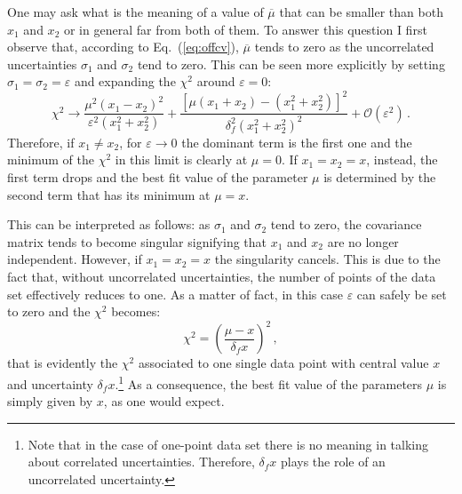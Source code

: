 \documentclass[10pt,a4paper]{article}
\begin{document}
One may ask what is the meaning of a value of $\overline{\mu}$ that
can be smaller than both $x_1$ and $x_2$ or in general far from both
of them. To answer this question I first observe that, according to
Eq.~(\ref{eq:offcv}), $\overline{\mu}$ tends to zero as the
uncorrelated uncertainties $\sigma_1$ and $\sigma_2$ tend to zero.
This can be seen more explicitly by setting
$\sigma_1=\sigma_2=\varepsilon$ and expanding the $\chi^2$ around
$\varepsilon = 0$:
\begin{equation}\label{eq:chi2exp}
\chi^2\rightarrow \frac{\mu^2(x_1-x_2)^2}{\varepsilon^2(x_1^2+x_2^2)}+\frac{\left[\mu(x_1+x_2)-(x_1^2+x_2^2)\right]^2}{\delta_f^2  (x_1^2+ x_2^2)^2}+\mathcal{O}(\varepsilon^2)\,.
\end{equation}
Therefore, if $x_1\neq x_2$, for $\varepsilon\rightarrow 0$ the
dominant term is the first one and the minimum of the $\chi^2$ in this
limit is clearly at $\mu=0$. If $x_1 = x_2=x$, instead, the first term
drops and the best fit value of the parameter $\mu$ is determined by
the second term that has its minimum at $\mu=x$.

This can be interpreted as follows: as $\sigma_1$ and $\sigma_2$ tend
to zero, the covariance matrix tends to become singular signifying
that $x_1$ and $x_2$ are no longer independent. However, if
$x_1=x_2=x$ the singularity cancels. This is due to the fact that,
without uncorrelated uncertainties, the number of points of the data
set effectively reduces to one. As a matter of fact, in this case
$\varepsilon$ can safely be set to zero and the $\chi^2$ becomes:
\begin{equation}
\chi^2= \left(\frac{\mu - x}{\delta_f  x}\right)^2\,,
\end{equation}
that is evidently the $\chi^2$ associated to one single data point
with central value $x$ and uncertainty $\delta_f x$.\footnote{Note
  that in the case of one-point data set there is no meaning in
  talking about correlated uncertainties. Therefore, $\delta_f x$
  plays the role of an uncorrelated uncertainty.}  As a consequence,
the best fit value of the parameters $\mu$ is simply given by $x$, as
one would expect.
\end{document}
